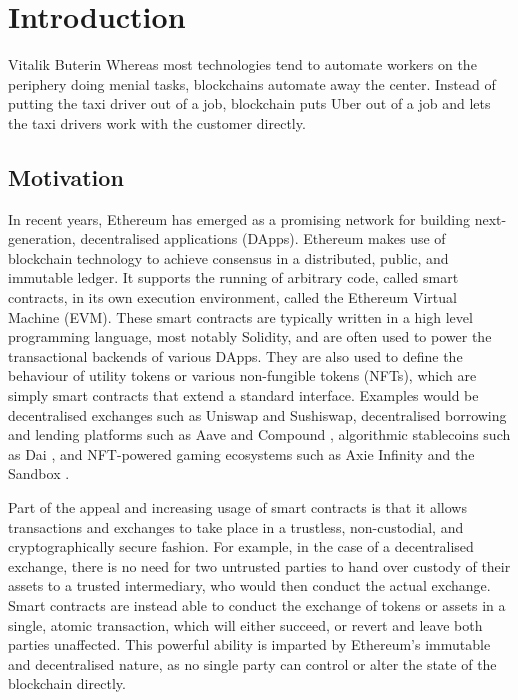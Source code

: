 \chapter{Introduction}

\begin{chapquote}{Vitalik Buterin \cite{vitalikquote}}
    Whereas most technologies tend to automate workers on the 
    periphery doing menial tasks, blockchains automate away the center.
    Instead of putting the taxi driver out of a job, blockchain puts 
    Uber out of a job and lets the taxi drivers work with the customer 
    directly.
\end{chapquote}

\section{Motivation}
In recent years, Ethereum has emerged as a promising network
for building next-generation, decentralised applications (DApps). Ethereum makes use of
blockchain technology to achieve consensus in a distributed, public,
and immutable ledger. It supports the running of arbitrary code, called smart contracts,
in its own execution environment, called the Ethereum Virtual Machine (EVM).
These smart contracts are typically written in a high level programming
language, most notably Solidity, and are often used to power the transactional
backends of various DApps. They are also used to define the behaviour of utility tokens 
or various non-fungible tokens (NFTs), which are simply smart contracts that extend a standard
interface. Examples would be decentralised exchanges such 
as Uniswap \cite{uniswap} and Sushiswap, decentralised borrowing and lending platforms such as
Aave \cite{aave} and Compound \cite{compound}, algorithmic stablecoins such as Dai \cite{makerdao}, and NFT-powered gaming 
ecosystems such as Axie Infinity \cite{axieinfinity} and the Sandbox \cite{sandbox}.

Part of the appeal and increasing usage of smart contracts is that it allows transactions and exchanges
to take place in a trustless, non-custodial, and cryptographically secure fashion.
For example, in the case of a decentralised exchange, there is no need for two
untrusted parties to hand over custody of their assets to a trusted intermediary,
who would then conduct the actual exchange. Smart contracts are instead able to conduct
the exchange of tokens or assets in a single, atomic transaction,
which will either succeed, or revert and leave both parties unaffected.
This powerful ability is imparted by Ethereum's immutable and decentralised nature, 
as no single party can control or alter the state of the blockchain directly.

